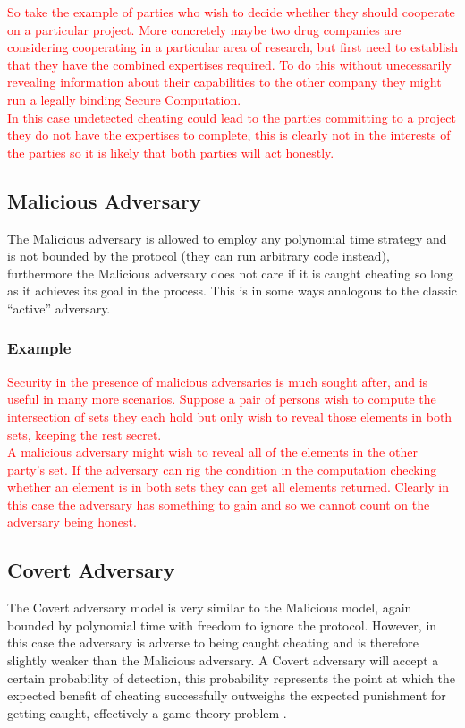 \documentclass[ %
                    author={Nicholas Tutte},
                supervisor={Prof. Nigel Smart},
                    degree={MEng},
                     title={Secure Two Party Computation},
                  subtitle={A practical comparison of recent protocols},
                      type={Research - GG1K},
                      year={2015} ]{dissertation}
\begin{document}
				\textcolor{red}{So take the example of parties who wish to decide whether they should cooperate on a particular project. More concretely maybe two drug companies are considering cooperating in a particular area of research, but first need to establish that they have the combined expertises required. To do this without unecessarily revealing information about their capabilities to the other company they might run a legally binding Secure Computation.}\\
				
				\textcolor{red}{In this case undetected cheating could lead to the parties committing to a project they do not have the expertises to complete, this is clearly not in the interests of the parties so it is likely that both parties will act honestly.}\\
				
				

			\subsection{Malicious Adversary}
				The Malicious adversary is allowed to employ any polynomial time strategy and is not bounded by the protocol (they can run arbitrary code instead), furthermore the Malicious adversary does not care if it is caught cheating so long as it achieves its goal in the process. This is in some ways analogous to the classic ``active'' adversary.

				\subsubsection{Example}
					\textcolor{red}{Security in the presence of malicious adversaries is much sought after, and is useful in many more scenarios. Suppose a pair of persons wish to compute the intersection of sets they each hold but only wish to reveal those elements in both sets, keeping the rest secret.}\\

					\textcolor{red}{A malicious adversary might wish to reveal all of the elements in the other party's set. If the adversary can rig the condition in the computation checking whether an element is in both sets they can get all elements returned. Clearly in this case the adversary has something to gain and so we cannot count on the adversary being honest.}\\


			\subsection{Covert Adversary}
				The Covert adversary model is very similar to the Malicious model, again bounded by polynomial time with freedom to ignore the protocol. However, in this case the adversary is adverse to being caught cheating and is therefore slightly weaker than the Malicious adversary. A Covert adversary will accept a certain probability of detection, this probability represents the point at which the expected benefit of cheating successfully outweighs the expected punishment for getting caught, effectively a game theory problem \cite{WhenGameTheoryMetSMC}.\\
\end{document}
